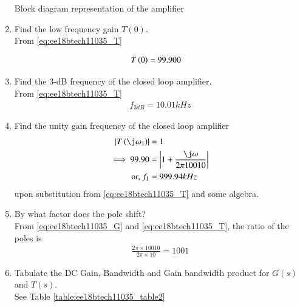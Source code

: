 \begin{enumerate}[label=\arabic*.,ref=\theenumi]
Block diagram representation of the amplifier
\begin{figure}[!ht]
    \begin{center}
		\resizebox{\columnwidth}{!}{}
	\end{center}
\caption{}
\label{fig:ee18btech11035_block}
\end{figure}

\item Find the low frequency gain $T(0)$.\\ 
\solution From \eqref{eq:ee18btech11035_T}

\begin{align}
    T\left(0\right)&= 99.900
\end{align}

\item Find the 3-dB frequency of the closed loop amplifier.\\
\solution From \eqref{eq:ee18btech11035_T}
\begin{align}
   f_{3dB} = 10.01kHz
\end{align}

\item Find the unity gain frequency of the closed loop amplifier\\
\solution 
\begin{align}
    \abs{T\brak{\j\omega_1}}&=1\\
\implies     
{99.90}&=\abs{1+\frac{\j\omega}{2\pi 10010}}
\\
\text{or, }    f_1 &= 999.94kHz
\end{align}
upon substitution from \eqref{eq:ee18btech11035_T} and some algebra.

\item By what factor does the pole shift?\\
\solution From \eqref{eq:ee18btech11035_G} and \eqref{eq:ee18btech11035_T}, the ratio of the poles is
\begin{align}
\frac{2\pi \times 10010}{2\pi \times 10} = 1001
\end{align}
%
\item Tabulate the DC Gain, Bandwidth and Gain bandwidth product for $G(s)$ and $T(s)$.
\\
\solution  See Table \ref{table:ee18btech11035_table2}
\begin{table}[!ht]
\centering

\caption{}
\label{table:ee18btech11035_table2}
\end{table}


\end{enumerate}
